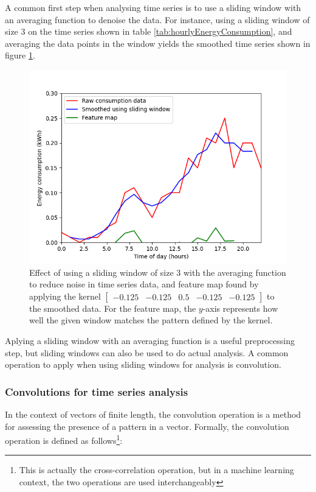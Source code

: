 A common first step when analysing time series is to use a sliding window with an averaging function to denoise the data. For instance, using a sliding window of size 3 on the time series shown in table \ref{tab:hourlyEnergyConsumption}, and averaging the data points in the window yields the smoothed time series shown in figure \ref{fig:slidingWindowIllustration}.

\begin{figure}
    \centering
    \includegraphics[scale=0.5]{img/prerequisites/energyConsumptionPlots.png}
    \caption{Effect of using a sliding window of size 3 with the averaging function to reduce noise in time series data, and feature map found by applying the kernel $\begin{bmatrix}-0.125 & -0.125 & 0.5 & -0.125 & -0.125 \end{bmatrix}$ to the smoothed data. For the feature map, the $y$-axis represents how well the given window matches the pattern defined by the kernel.}
    \label{fig:slidingWindowIllustration}
\end{figure}

Aplying a sliding window with an averaging function is a useful preprocessing step, but sliding windows can also be used to do actual analysis. A common operation to apply when using sliding windows for analysis is convolution.

\subsubsection{Convolutions for time series analysis}
In the context of vectors of finite length, the convolution operation is a method for assessing the presence of a pattern in a vector. Formally, the convolution operation is defined as follows\footnote{This is actually the cross-correlation operation, but in a machine learning context, the two operations are used interchangeably}:

